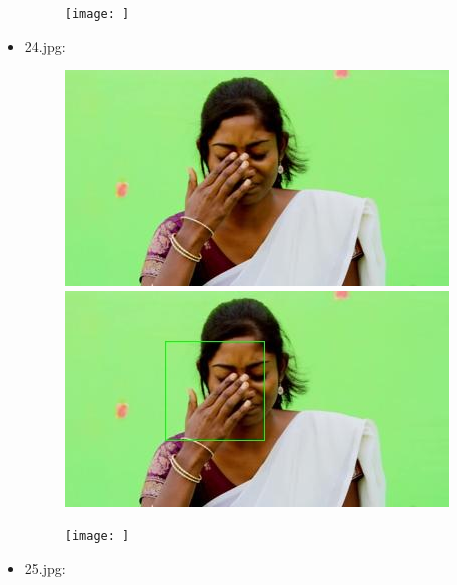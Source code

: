 \begin{itemize}
\begin{figure}[!htb]
\begin{minipage}{0.33\textwidth}
            \end{minipage}\hfill
            \begin{minipage}{0.33\textwidth}
                \centering
                \texttt{[image: ]}
            \end{minipage}
        \end{figure}
    \newpage
    \item 24.jpg:
        \begin{figure}[!htb]
            \begin{minipage}{0.33\textwidth}
            \centering
            \includegraphics[scale = 0.45]{images/results/original/24.jpg}
            \end{minipage}\hfill
            \begin{minipage}{0.33\textwidth}
                \centering
                \includegraphics[scale = 0.45]{images/results/detection/24_detections.jpg}
            \end{minipage}\hfill
            \begin{minipage}{0.33\textwidth}
                \centering
                \texttt{[image: ]}
            \end{minipage}
        \end{figure}
    \item 25.jpg:
        \begin{figure}[!htb]
            \begin{minipage}{0.33\textwidth}

\end{minipage}
\end{figure}
\end{itemize}
